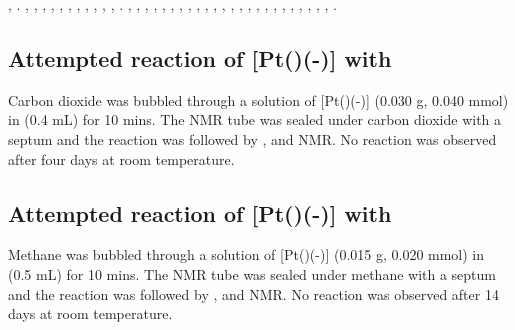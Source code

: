 ,
.
,
,
,
,
,
,
,
,
,
,
,
.
,
,
,
,
,
,
,
,
,
,
,
,
,
,
,
,
,
,
,
,
,
,
,
,
.


\subsection*{Attempted reaction of \texorpdfstring{[Pt(\tButhixantphos)(-)]} P with \texorpdfstring{} C}

Carbon dioxide was bubbled through a solution of [Pt(\tButhixantphos)(-)] (0.030 g, 0.040 mmol) in  (0.4 mL) for 10 mins.  The NMR tube was sealed under carbon dioxide with a septum and the reaction was followed by \proton{}, \carbon{} and \phosphorus{} NMR.  No reaction was observed after four days at room temperature.  

\subsection*{Attempted reaction of \texorpdfstring{[Pt(\tButhixantphos)(-)]} P with \texorpdfstring{} C}

Methane was bubbled through a solution of [Pt(\tButhixantphos)(-)] (0.015 g, 0.020 mmol)  in  (0.5 mL) for 10 mins.  The NMR tube was sealed under methane with a septum and the reaction was followed by \proton{}, \carbon{} and \phosphorus{} NMR.  No reaction was observed after 14 days at room temperature.

